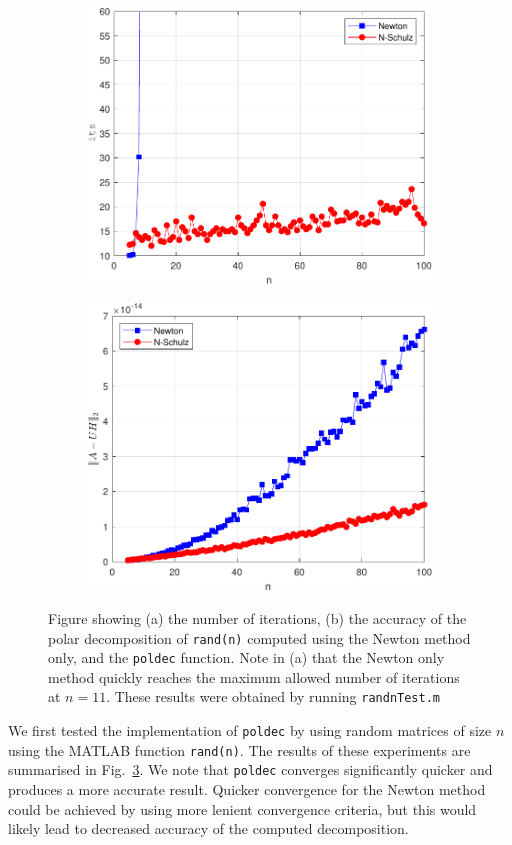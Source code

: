 \documentclass[10pt, A4paper]{article}
\begin{document}
\begin{figure}[t]
	\centering
	\begin{subfigure}{0.5\textwidth}
		\centering
		\includegraphics[width=.8\linewidth]{randnIts.pdf}
		\caption{\label{fig:randnIts}}
	\end{subfigure}%
	\begin{subfigure}{0.5\textwidth}
		\centering
		\includegraphics[width=.8\linewidth]{randnAccuracy.pdf}
		\caption{\label{fig:randnAccuracy}}
	\end{subfigure}
	\caption{
	Figure showing (a) the number of iterations,
	(b) the accuracy of the polar decomposition of 
	\texttt{rand(n)} computed using the Newton method only, and the 
	\texttt{poldec} function. Note in (a) that the Newton only method 
	quickly reaches the maximum allowed number of iterations at $n = 
	11$. These results were obtained by running \texttt{randnTest.m}
	\label{fig:randn}}
\end{figure}
We first tested the implementation of \texttt{poldec} by using random 
matrices of size $n$ using the MATLAB function \texttt{rand(n)}. The 
results of these experiments are summarised in Fig.~\ref{fig:randn}.
We note that \texttt{poldec} converges significantly quicker and 
produces a more accurate result.
Quicker convergence for the Newton method could be achieved by using 
more lenient convergence criteria, but this would likely lead 
to decreased accuracy of the computed decomposition.
\end{document}
